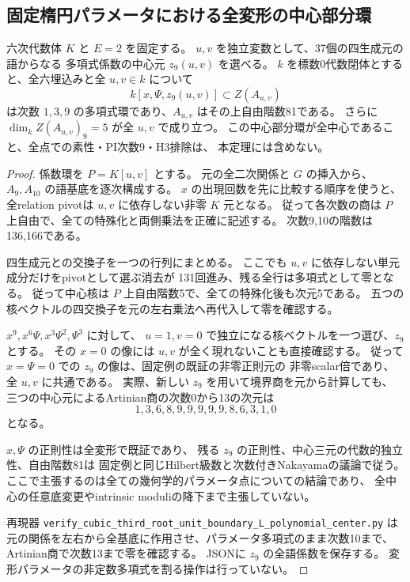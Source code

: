 \subsection{固定楕円パラメータにおける全変形の中心部分環}
\label{subsec:cubic-third-root-unit-boundary-L-polynomial-center}
\begin{theorem}[$E=2$、全 $u,v$ の中心自由加群]
\label{thm:cubic-third-root-unit-boundary-L-polynomial-center}
六次代数体 $K$ と $E=2$ を固定する。
$u,v$ を独立変数として、37個の四生成元の語からなる
多項式係数の中心元 $z_9(u,v)$ を選べる。
$k$ を標数0代数閉体とすると、全六埋込みと全 $u,v\in k$ について
\[
 k[x,\Psi,z_9(u,v)]\subset Z(A_{u,v})
\]
は次数 $1,3,9$ の多項式環であり、$A_{u,v}$ はその上自由階数81である。
さらに $\dim_k Z(A_{u,v})_9=5$ が全 $u,v$ で成り立つ。
この中心部分環が全中心であること、全点での素性・PI次数9・H3排除は、
本定理には含めない。
\end{theorem}
\begin{proof}
係数環を $P=K[u,v]$ とする。
元の全二次関係と $G$ の挿入から、$A_9,A_{10}$ の語基底を逐次構成する。
$x$ の出現回数を先に比較する順序を使うと、全relation pivotは
$u,v$ に依存しない非零 $K$ 元となる。
従って各次数の商は $P$ 上自由で、全ての特殊化と両側乗法を正確に記述する。
次数9,10の階数は136,166である。

四生成元との交換子を一つの行列にまとめる。
ここでも $u,v$ に依存しない単元成分だけをpivotとして選ぶ消去が
131回進み、残る全行は多項式として零となる。
従って中心核は $P$ 上自由階数5で、全ての特殊化後も次元5である。
五つの核ベクトルの四交換子を元の左右乗法へ再代入して零を確認する。

$x^9,x^6\Psi,x^3\Psi^2,\Psi^3$ に対して、
$u=1,v=0$ で独立になる核ベクトルを一つ選び、$z_9$ とする。
その $x=0$ の像には $u,v$ が全く現れないことも直接確認する。
従って $x=\Psi=0$ での $z_9$ の像は、固定例の既証の非零正則元の
非零scalar倍であり、全 $u,v$ に共通である。
実際、新しい $z_9$ を用いて境界商を元から計算しても、
三つの中心元によるArtinian商の次数0から13の次元は
\[
 1,3,6,8,9,9,9,9,9,8,6,3,1,0
\]
となる。

$x,\Psi$ の正則性は全変形で既証であり、
残る $z_9$ の正則性、中心三元の代数的独立性、自由階数81は
固定例と同じHilbert級数と次数付きNakayamaの議論で従う。
ここで主張するのは全ての幾何学的パラメータ点についての結論であり、
全中心の任意底変更やintrinsic moduliの降下まで主張していない。

再現器 \texttt{verify\_cubic\_third\_root\_unit\_boundary\_L\_polynomial\_center.py}
は元の関係を左右から全基底に作用させ、パラメータ多項式のまま次数10まで、
Artinian商で次数13まで零を確認する。
JSONに $z_9$ の全語係数を保存する。
変形パラメータの非定数多項式を割る操作は行っていない。
\end{proof}
